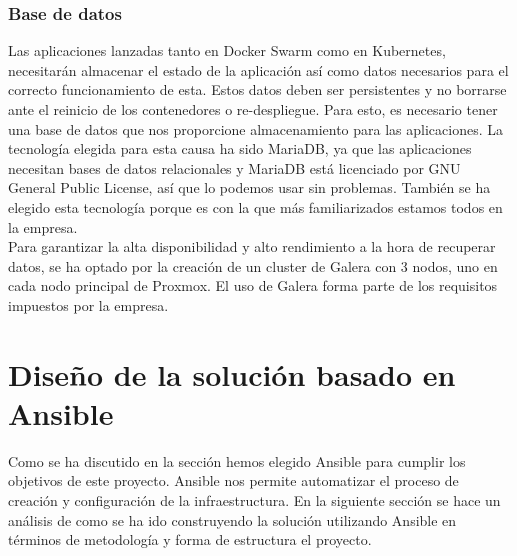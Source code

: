 \subsubsection{Base de datos}
\begin{text}
	Las aplicaciones lanzadas tanto en Docker Swarm como en Kubernetes, necesitarán almacenar el estado de la aplicación así como datos necesarios para el correcto funcionamiento de esta. Estos datos deben ser persistentes y no borrarse ante el reinicio de los contenedores o re-despliegue. Para esto, es necesario tener una base de datos que nos proporcione almacenamiento para las aplicaciones. La tecnología elegida para esta causa ha sido MariaDB, ya que las aplicaciones necesitan bases de datos relacionales y MariaDB está licenciado por GNU General Public License, así que lo podemos usar sin problemas. También se ha elegido esta tecnología porque es con la que más familiarizados estamos todos en la empresa. \\
	Para garantizar la alta disponibilidad y alto rendimiento a la hora de recuperar datos, se ha optado por la creación de un cluster de Galera \cite{galeracluster:online} con 3 nodos, uno en cada nodo principal de Proxmox. El uso de Galera forma parte de los requisitos impuestos por la empresa.
\end{text}

\section{Diseño de la solución basado en Ansible}
\begin{text}
	Como se ha discutido en la sección  hemos elegido Ansible para cumplir los objetivos de este proyecto. Ansible nos permite automatizar el proceso de creación y configuración de la infraestructura. En la siguiente sección se hace un análisis de como se ha ido construyendo la solución utilizando Ansible en términos de metodología y forma de estructura el proyecto.
\end{text}

